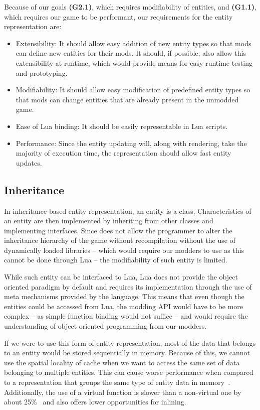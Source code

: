 Because of our goals \textbf{(G2.1)}, which requires modifiability of entities, and \textbf{(G1.1)}, which requires our game to be
performant, our requirements for the entity representation are:

\begin{itemize}
    \item Extensibility: It should allow easy addition of new entity types so that mods can define new entities for their mods. It
        should, if possible, also allow this extensibility at runtime, which would provide means for easy runtime testing and prototyping.
    \item Modifiability: It should allow easy modification of predefined entity types so that mods can change entities that are already
        present in the unmodded game.
    \item Ease of Lua binding: It should be easily representable in Lua scripts.
    \item Performance: Since the entity updating will, along with rendering, take the majority of execution time, the representation should
        allow fast entity updates.
\end{itemize}

\subsection{Inheritance}

In inheritance based entity representation, an entity is a class. Characteristics of an entity are then implemented by inheriting
from other classes and implementing interfaces. Since \cpp does not allow the programmer to alter the inheritance hierarchy of the game
without recompilation without the use of dynamically loaded libraries -- which would require our modders to use \cpp as this cannot
be done through Lua -- the modifiability of such entity is limited.

While such entity can be interfaced to Lua, Lua does not provide the object oriented paradigm by default and requires its implementation
through the use of meta mechanisms provided by the language. This means that even though the entities could be accessed from Lua, the
modding API would have to be more complex -- as simple function binding would not suffice -- and would require the understanding
of object oriented programming from our modders.

If we were to use this form of entity representation, most of the data that belongs to an entity would be stored sequentially in memory.
Because of this, we cannot use the spatial locality of cache when we want to access the same set of data belonging to multiple entities.
This can cause worse performance when compared to a representation that groups the same type of entity data in memory~\cite{OOPPitfalls}.
Additionally, the use of a virtual function is slower than a non-virtual one by about 25\%~\cite{CppProgLang} and also offers lower 
opportunities for inlining.

